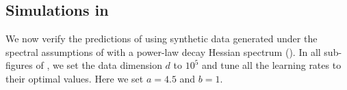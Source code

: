 \vspace{-0.4cm}
\subsection{Simulations in } \label{sec:power-spectrum-experiment}
\vspace{-0.3cm}
We now verify the predictions of  using synthetic data generated under the spectral assumptions of  
with a power-law decay Hessian spectrum ().
In all sub-figures of , we set the data dimension $d$ to $10^5$ and tune all the learning rates to their optimal values. Here we set $a=4.5$ and $b=1$.



